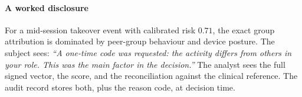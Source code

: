 \documentclass[conference]{IEEEtran}
\begin{document}
\paragraph{A worked disclosure}
For a mid-session takeover event with calibrated risk $0.71$, the exact group
attribution is dominated by peer-group behaviour and device posture. The
subject sees: \emph{``A one-time code was requested: the activity differs from
others in your role. This was the main factor in the decision.''} The analyst
sees the full signed vector, the score, and the reconciliation against the
clinical reference. The audit record stores both, plus the reason code, at
decision time.
\end{document}
